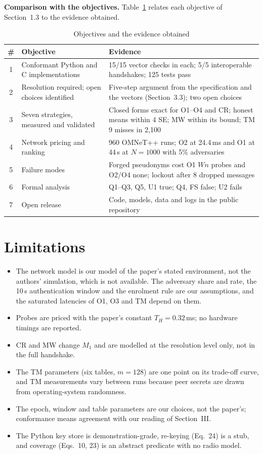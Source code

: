 \textbf{Comparison with the objectives.} Table~\ref{tab:objectives} relates each objective of Section~1.3 to the evidence obtained.

\begin{table}[H]
\centering
\caption{Objectives and the evidence obtained}
\label{tab:objectives}
\small
\renewcommand{\arraystretch}{1.2}
\begin{tabularx}{\textwidth}{|c|>{\raggedright\arraybackslash}p{}|X|}
\hline
\textbf{\#} & \textbf{Objective} & \textbf{Evidence}\\ \hline
1 & Conformant Python and C implementations & 15/15 vector checks in each; 5/5 interoperable handshakes; 125 tests pass\\ \hline
2 & Resolution required; open choices identified & Five-step argument from the specification and the vectors (Section~3.3); two open choices\\ \hline
3 & Seven strategies, measured and validated & Closed forms exact for O1--O4 and CR; honest means within 4 SE; MW within its bound; TM 9 misses in 2,100\\ \hline
4 & Network pricing and ranking & 960 OMNeT++ runs; O2 at 24.4\,ms and O1 at 44\,s at $N=1000$ with 5\% adversaries\\ \hline
5 & Failure modes & Forged pseudonyms cost O1 $Wn$ probes and O2/O4 none; lockout after 8 dropped messages\\ \hline
6 & Formal analysis & Q1--Q3, Q5, U1 true; Q4, FS false; U2 fails\\ \hline
7 & Open release & Code, models, data and logs in the public repository\\ \hline
\end{tabularx}
\end{table}

\section{Limitations}
\begin{itemize}
\item The network model is our model of the paper's stated environment, not the authors' simulation, which is not available. The adversary share and rate, the 10\,s authentication window and the enrolment rule are our assumptions, and the saturated latencies of O1, O3 and TM depend on them.
\item Probes are priced with the paper's constant $T_H=0.32$\,ms; no hardware timings are reported.
\item CR and MW change $M_1$ and are modelled at the resolution level only, not in the full handshake.
\item The TM parameters (six tables, $m=128$) are one point on its trade-off curve, and TM measurements vary between runs because peer secrets are drawn from operating-system randomness.
\item The epoch, window and table parameters are our choices, not the paper's; conformance means agreement with our reading of Section~III.
\item The Python key store is demonstration-grade, re-keying (Eq.~24) is a stub, and coverage (Eqs.~10, 23) is an abstract predicate with no radio model.
\end{itemize}

